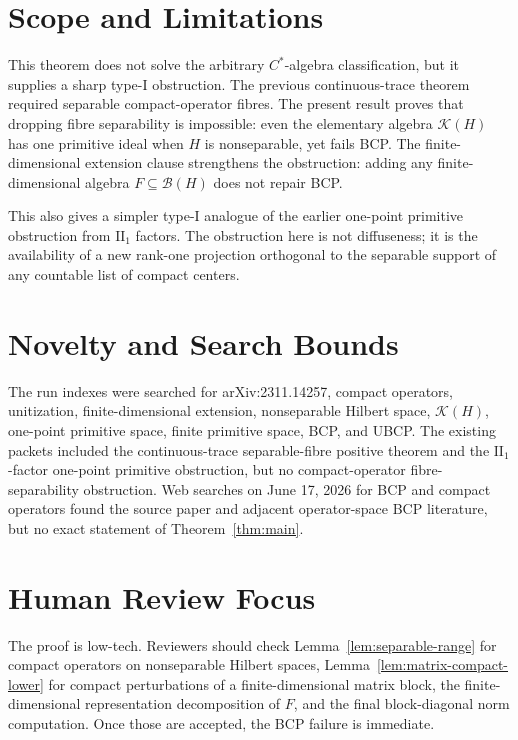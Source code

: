 \documentclass[11pt]{article}
\newcommand{\Kcal}{\mathcal K}
\begin{document}
\section*{Scope and Limitations}

This theorem does not solve the arbitrary \(C^*\)-algebra classification, but
it supplies a sharp type-I obstruction.  The previous continuous-trace theorem
required separable compact-operator fibres.  The present result proves that
dropping fibre separability is impossible: even the elementary algebra
\(\Kcal(H)\) has one primitive ideal when \(H\) is nonseparable, yet fails BCP.
The finite-dimensional extension clause strengthens the obstruction: adding
any finite-dimensional algebra \(F\subseteq\mathcal B(H)\) does not repair
BCP.

This also gives a simpler type-I analogue of the earlier one-point primitive
obstruction from \(\mathrm{II}_1\) factors.  The obstruction here is not
diffuseness; it is the availability of a new rank-one projection orthogonal to
the separable support of any countable list of compact centers.

\section*{Novelty and Search Bounds}

The run indexes were searched for arXiv:2311.14257, compact operators,
unitization, finite-dimensional extension, nonseparable Hilbert space,
\(\Kcal(H)\), one-point primitive space, finite primitive space, BCP, and
UBCP.  The existing packets included the continuous-trace separable-fibre
positive theorem and the \(\mathrm{II}_1\)-factor one-point primitive
obstruction, but no compact-operator fibre-separability obstruction.  Web
searches on June 17, 2026 for BCP and compact operators found the source paper
and adjacent operator-space BCP literature, but no exact statement of
Theorem~\ref{thm:main}.

\section*{Human Review Focus}

The proof is low-tech.  Reviewers should check Lemma~\ref{lem:separable-range}
for compact operators on nonseparable Hilbert spaces,
Lemma~\ref{lem:matrix-compact-lower} for compact perturbations of a
finite-dimensional matrix block, the finite-dimensional representation
decomposition of \(F\), and the final block-diagonal norm computation.  Once
those are accepted, the BCP failure is immediate.
\end{document}
